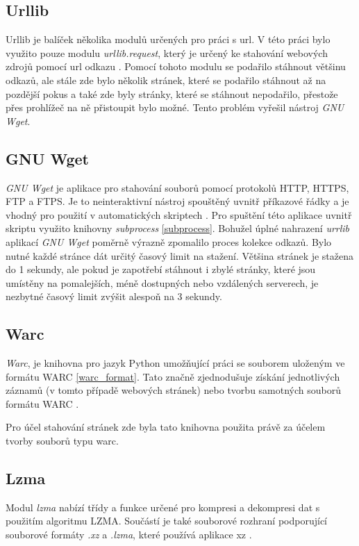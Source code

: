 \subsection{Urllib}
\label{urllib}
Urllib je balíček několika modulů určených pro práci s url. V této práci bylo využito pouze modulu \textit{urllib.request},
který je určený ke stahování webových zdrojů pomocí url odkazu \cite{URLLIB}. Pomocí tohoto modulu se podařilo stáhnout většinu
odkazů, ale stále zde bylo několik stránek, které se podařilo stáhnout až na pozdější pokus a také zde byly stránky, které
se stáhnout nepodařilo, přestože přes prohlížeč na ně přistoupit bylo možné. Tento problém vyřešil nástroj \textit{GNU Wget}.

\subsection{GNU Wget}
\label{wget}
\textit{GNU Wget} je aplikace pro stahování souborů pomocí protokolů HTTP, HTTPS, FTP a FTPS. Je to neinteraktivní nástroj spouštěný uvnitř
příkazové řádky a je vhodný pro použití v automatických skriptech \cite{WGET}. Pro spuštění této aplikace uvnitř skriptu využito knihovny \textit{subprocess} \ref{subprocess}.
Bohužel úplné nahrazení \textit{urrlib} aplikací \textit{GNU Wget} poměrně výrazně zpomalilo proces kolekce odkazů. Bylo nutné každé stránce dát určitý časový limit
na stažení. Většina stránek je stažena do 1 sekundy, ale pokud je zapotřebí stáhnout i zbylé stránky, které jsou umístěny na pomalejších, méně dostupných
nebo vzdálených serverech, je nezbytné časový limit zvýšit alespoň na 3 sekundy.

\subsection{Warc}
\label{warc}
\textit{Warc}, je knihovna pro jazyk Python umožňující práci se souborem uloženým ve formátu WARC \ref{warc_format}. Tato
značně zjednodušuje získání jednotlivých záznamů (v tomto případě webových stránek) nebo tvorbu samotných souborů
formátu WARC \cite{WARC}.

Pro účel stahování stránek zde byla tato knihovna použita právě za účelem tvorby souborů
typu warc.

\subsection{Lzma}
\label{lzma}
Modul \textit{lzma} nabízí třídy a funkce určené pro kompresi a dekompresi dat s použitím algoritmu LZMA.
Součástí je také souborové rozhraní podporující souborové formáty \textit{.xz} a \textit{.lzma}, které
používá aplikace xz \cite{LZMA}.

